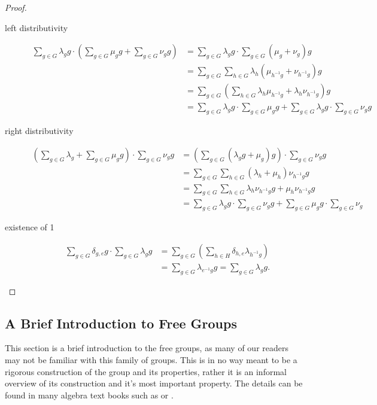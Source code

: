 \documentclass[titlepage, a4paper]{article}
\theoremstyle{remark}
\begin{document}
\begin{proof}
\begin{description}
		\item[left distributivity]
		\begin{align*}
		\sum_{g \in G} \lambda_g g \cdot \left(\sum_{g \in G} \mu_g g + \sum_{g \in G} \nu_g g \right) 
		&= \sum_{g \in G} \lambda_g g \cdot \sum_{g \in G} (\mu_g + \nu_g) g \\
		&= \sum_{g \in G} \sum_{h \in G} \lambda_h (\mu_{h^{-1}g} + \nu_{h^{-1}g}) g \\
		&= \sum_{g \in G} \left(\sum_{h \in G} \lambda_h \mu_{h^{-1}g} + \lambda_h \nu_{h^{-1}g}\right) g \\
		&= \sum_{g \in G} \lambda_g g \cdot \sum_{g \in G} \mu_g g
			+ \sum_{g \in G} \lambda_g g \cdot \sum_{g \in G} \nu_g g
		\end{align*}
	
		\item[right distributivity]
		\begin{align*}
		\left(\sum_{g \in G} \lambda_g + \sum_{g \in G} \mu_g g\right) \cdot \sum_{g \in G} \nu_g g
		&= \left(\sum_{g \in G} (\lambda_g g + \mu_g) g\right) \cdot \sum_{g \in G} \nu_g g\\
		&= \sum_{g \in G} \sum_{h \in G} (\lambda_h + \mu_h) \nu_{h^{-1}g} g \\
		&= \sum_{g \in G} \sum_{h \in G} \lambda_h \nu_{h^{-1}g} g + \mu_h \nu_{h^{-1}g} g \\
		&= \sum_{g \in G} \lambda_g g \cdot \sum_{g \in G} \nu_g g + \sum_{g \in G} \mu_g g \cdot \sum_{g \in G} \nu_g 
		\end{align*}
	
		\item[existence of 1]
		\begin{align*}
		\sum_{g \in G} \delta_{g,e} g \cdot \sum_{g \in G} \lambda_g g
		&= \sum_{g \in G} \left(\sum_{h \in H} \delta_{h,e} \lambda_{h^{-1}g} \right) \\
		&= \sum_{g \in G} \lambda_{e^{-1}g} g = \sum_{g \in G} \lambda_g g.
		\end{align*}
		
		\end{description}
        \end{proof}

	\subsection{A Brief Introduction to Free Groups} \label{sec:intro_free_group}
This section is a brief introduction to the free groups, as many of our readers may not be familiar with this family of groups. 
This is in no way meant to be a rigorous construction of the group and its properties, rather it is an informal overview of its construction and it's most important property.
The details can be found in many algebra text books such as \cite[section 7.9]{artin_algebra_1991} or \cite[section 5.5]{rotman_advanced_2015}.
\end{document}
